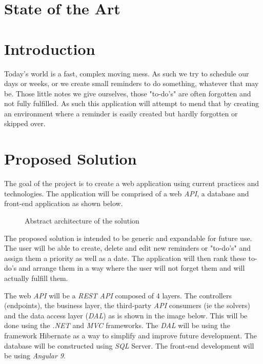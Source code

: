 \documentclass[12pt]{paper}
\begin{document}
	\section{State of the Art}

	\setcounter{page}{2}
	\section{Introduction}
	Today's world is a fast, complex moving mess. As such we try to schedule our days or weeks, or we create small reminders to do something, whatever that may be. Those little notes we give ourselves, those "to-do's" are often forgotten and not fully fulfilled. As such this application will attempt to mend that by creating an environment where a reminder is easily created but hardly forgotten or skipped over.
		
	\section{Proposed Solution}
		The goal of the project is to create a web application using current practices and technologies. The application will be comprised of a web \textit{API}, a database and front-end application as shown below.
		\begin{figure}[!h]
			\centering
			\caption{Abstract architecture of the solution}
		\end{figure}
		\vspace{0.5cm}
		The proposed solution is intended to be generic and expandable for future use.
		The user will be able to create, delete and edit new reminders or "to-do's" and assign them a priority as well as a date. The application will then rank these to-do's and arrange them in a way where the user will not forget them and will actually fulfill them.
		
		The web \textit{API} will be a \textit{REST} \textit{API} composed of 4 layers. The controllers (endpoints), the business layer, the third-party \textit{API} consumers (ie the solvers) and the data access layer (\textit{DAL}) as is shown in the image below. This will be done using the \textit{.NET \cite{dot_net}} and \textit{MVC \cite{mvc}} frameworks. The \textit{DAL} will be using the framework Hibernate \cite{hibernate} as a way to simplify and improve future development. 
		The database will be constructed using \textit{SQL} Server\cite{sql_server}.
		The front-end development will be using \textit{Angular 9}\cite{angular}.
		
\end{document}
